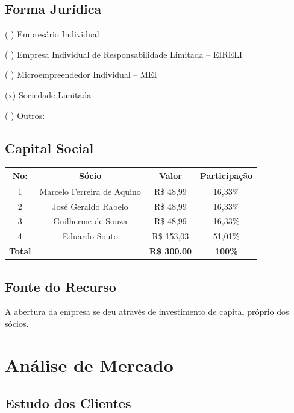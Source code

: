 \documentclass[
	12pt,				%
	openright,			%
	twoside,			%
	a4paper,			%
	english,			%
	french,				%
	spanish,			%
	brazil,				%
	]{abntex2}
\begin{document}
\section{Forma Jurídica}

( ) Empresário Individual

( ) Empresa Individual de Responsabilidade Limitada – EIRELI

( ) Microempreendedor Individual – MEI

(x) Sociedade Limitada

( ) Outros:

\section{Capital Social}

\begin{center}
	\begin{tabular}{|c|c|c|c|}
		\hline
		\textbf{No:}	& \textbf{Sócio}				& \textbf{Valor} & \textbf{Participação} \\ \hline
		1				& Marcelo Ferreira de Aquino 	& R\$ 48,99 & 16,33\% \\ \hline
		2				& José Geraldo Rabelo 			& R\$ 48,99 & 16,33\% \\ \hline
		3				& Guilherme de Souza 			& R\$ 48,99 & 16,33\% \\ \hline
		4				& Eduardo Souto 				& R\$ 153,03 & 51,01\% \\ \hline
		\textbf{Total}	& 	 							& \textbf{R\$ 300,00} & \textbf{100\% }\\ \hline
	\end{tabular}
\end{center}

\section{Fonte do Recurso}

A abertura da empresa se deu através de investimento de capital próprio dos sócios.



\chapter{Análise de Mercado}

\section{Estudo dos Clientes}
\end{document}
